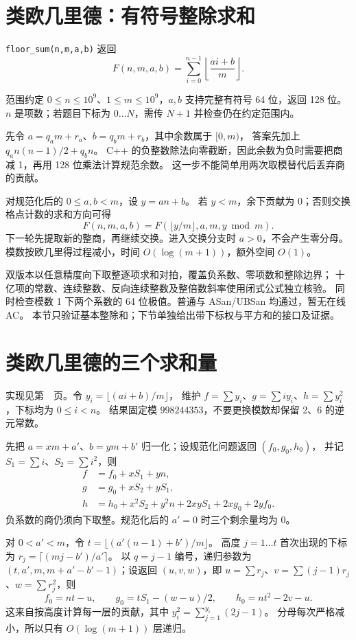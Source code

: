 \section{类欧几里德：有符号整除求和}
\texttt{floor\_sum(n,m,a,b)} 返回
\[
F(n,m,a,b)=\sum_{i=0}^{n-1}\left\lfloor\frac{ai+b}{m}\right\rfloor.
\]

范围约定 $0\le n\le10^9$、$1\le m\le10^9$，$a,b$ 支持完整有符号 64 位，返回 128 位。
$n$ 是项数；若题目下标为 $0\ldots N$，需传 $N+1$ 并检查仍在约定范围内。

先令 $a=q_a m+r_a$、$b=q_bm+r_b$，其中余数属于 $[0,m)$，
答案先加上 $q_a n(n-1)/2+q_b n$。
C++ 的负整数除法向零截断，因此余数为负时需要把商减 1，再用 128 位乘法计算规范余数。
这一步不能简单用两次取模替代后丢弃商的贡献。

对规范化后的 $0\le a,b<m$，设 $y=an+b$。
若 $y<m$，余下贡献为 0；否则交换格点计数的求和方向可得
\[
F(n,m,a,b)=F(\lfloor y/m\rfloor,a,m,y\bmod m).
\]
下一轮先提取新的整商，再继续交换。进入交换分支时 $a>0$，不会产生零分母。
模数按欧几里得过程减小，时间 $O(\log(m+1))$，额外空间 $O(1)$。

双版本以任意精度向下取整逐项求和对拍，覆盖负系数、零项数和整除边界；
十亿项的常数、连续整数、反向连续整数及整倍数斜率使用闭式公式独立核验。
同时检查模数 1 下两个系数的 64 位极值。普通与 ASan/UBSan 均通过，暂无在线 AC。
本节只验证基本整除和；下节单独给出带下标权与平方和的接口及证据。

\section{类欧几里德的三个求和量}
实现见第~\pageref{compact-floor_moments}~页。令 $y_i=\lfloor(ai+b)/m\rfloor$，
维护 $f=\sum y_i$、$g=\sum i y_i$、$h=\sum y_i^2$，下标均为 $0\le i<n$。
结果固定模 $998244353$，不要更换模数却保留 2、6 的逆元常数。

先把 $a=xm+a'$、$b=ym+b'$ 归一化；设规范化问题返回 $(f_0,g_0,h_0)$，
并记 $S_1=\sum i$、$S_2=\sum i^2$，则
\[
\begin{aligned}
f&=f_0+xS_1+yn,\\
g&=g_0+xS_2+yS_1,\\
h&=h_0+x^2S_2+y^2n+2xyS_1+2xg_0+2yf_0.
\end{aligned}
\]
负系数的商仍须向下取整。规范化后的 $a'=0$ 时三个剩余量均为 0。

对 $0<a'<m$，令 $t=\lfloor(a'(n-1)+b')/m\rfloor$。
高度 $j=1\ldots t$ 首次出现的下标为 $r_j=\lceil(mj-b')/a'\rceil$。
以 $q=j-1$ 编号，递归参数为 $(t,a',m,m+a'-b'-1)$；设返回 $(u,v,w)$，即
$u=\sum r_j$、$v=\sum(j-1)r_j$、$w=\sum r_j^2$，则
\[
f_0=nt-u,\qquad g_0=tS_1-(w-u)/2,\qquad h_0=nt^2-2v-u.
\]
这来自按高度计算每一层的贡献，其中 $y_i^2=\sum_{j=1}^{y_i}(2j-1)$。
分母每次严格减小，所以只有 $O(\log(m+1))$ 层递归。

